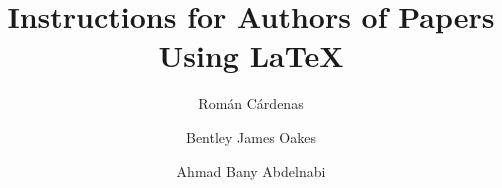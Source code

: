 \documentclass{scspaperproc}
\theoremstyle{scsthe}
\begin{document}
%
%

    \def\SCSconferencename{Annual Modeling and Simulation Conference}

    \def\SCSconferenceacro{ANNSIM'26}

    \def\SCSpublicationyear{2026}

    \def\SCSconferenceeditors{G. Rabadi, V. Prabhu, R. Cárdenas, A. Bany Abdelnabi, J. Jabbour, and M. Germanos}

    \def\SCSconferencedates{May 4-7}

    \def\SCSconferencevenue{University of Central Florida, Orlando, Florida, USA}

    \title{Instructions for Authors of Papers Using \LaTeX}

    \author[\authorrefmark{1}]{Román Cárdenas}
    \author[\authorrefmark{2}]{Bentley James Oakes}
    \author[\authorrefmark{3}]{Ahmad Bany Abdelnabi}



\end{document}
